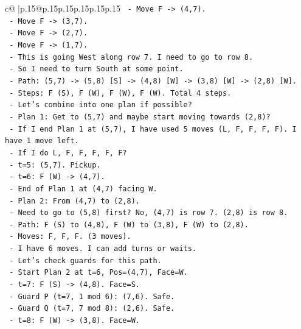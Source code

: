 \documentclass{article}
\begin{document}
{\begin{supertabular}{c@{$\;$}|p{.15\linewidth}@{}p{.15\linewidth}p{.15\linewidth}p{.15\linewidth}p{.15\linewidth}p{.15\linewidth}}
{{{\texttt{      {-} Move F {-}> (4,7).} \\
\texttt{      {-} Move F {-}> (3,7).} \\
\texttt{      {-} Move F {-}> (2,7).} \\
\texttt{      {-} Move F {-}> (1,7).} \\
\texttt{      {-} This is going West along row 7. I need to go to row 8.} \\
\texttt{      {-} So I need to turn South at some point.} \\
\texttt{      {-} Path: (5,7) {-}> (5,8) {[}S{]} {-}> (4,8) {[}W{]} {-}> (3,8) {[}W{]} {-}> (2,8) {[}W{]}.} \\
\texttt{      {-} Steps: F (S), F (W), F (W), F (W). Total 4 steps.} \\
\texttt{      {-} Let's combine into one plan if possible?} \\
\texttt{      {-} Plan 1: Get to (5,7) and maybe start moving towards (2,8)?} \\
\texttt{      {-} If I end Plan 1 at (5,7), I have used 5 moves (L, F, F, F, F). I have 1 move left.} \\
\texttt{      {-} If I do L, F, F, F, F, F?} \\
\texttt{        {-} t=5: (5,7). Pickup.} \\
\texttt{        {-} t=6: F (W) {-}> (4,7).} \\
\texttt{        {-} End of Plan 1 at (4,7) facing W.} \\
\texttt{      {-} Plan 2: From (4,7) to (2,8).} \\
\texttt{        {-} Need to go to (5,8) first? No, (4,7) is row 7. (2,8) is row 8.} \\
\texttt{        {-} Path: F (S) to (4,8), F (W) to (3,8), F (W) to (2,8).} \\
\texttt{        {-} Moves: F, F, F. (3 moves).} \\
\texttt{        {-} I have 6 moves. I can add turns or waits.} \\
\texttt{        {-} Let's check guards for this path.} \\
\texttt{        {-} Start Plan 2 at t=6, Pos=(4,7), Face=W.} \\
\texttt{        {-} t=7: F (S) {-}> (4,8). Face=S.} \\
\texttt{          {-} Guard P (t=7, 1 mod 6): (7,6). Safe.} \\
\texttt{          {-} Guard Q (t=7, 7 mod 8): (2,6). Safe.} \\
\texttt{        {-} t=8: F (W) {-}> (3,8). Face=W.} \\
}}}
\end{supertabular}}
\end{document}
